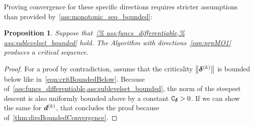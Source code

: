 \documentclass{article}
\theoremstyle{plain}
\newtheorem{proposition}[theorem]{Proposition}
\theoremstyle{definition}
\begin{document}
Proving convergence for these specific directions
requires stricter assumptions than 
provided by~\cref{ass:monotonic_seq_bounded}:

\begin{proposition}\label{thm:prpMO1convergence}
Suppose that~\cref{%
ass:funcs_differentiable,%
ass:sublevelset_bounded}
hold.
The Algorithm with directions~\eqref{eqn:prpMO1}
produces a critical sequence.
\end{proposition}

\begin{proof}
For a proof by contradiction, assume that 
the criticality $\left\|\bm{\delta}^{(k)}\right\|$ is bounded below like in~\eqref{eqn:critBoundedBelow}.
Because of~\cref{ass:funcs_differentiable,ass:sublevelset_bounded},
the norm of the steepest descent is also uniformly bounded 
above by a constant $\mathtt C_{\bm{\delta}} > 0$.
If we can show the same for $\bm{d}^{(k)}$, that concludes the proof
because of~\cref{thm:dirsBoundedConvergence}.


\end{proof}
\end{document}

